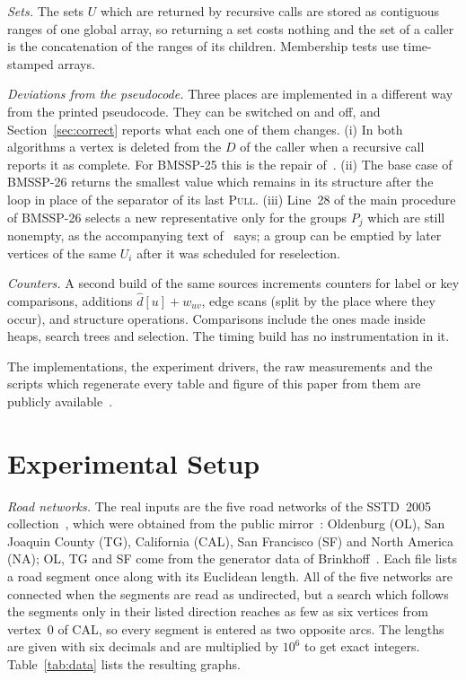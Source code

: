 \documentclass[conference,a4paper]{IEEEtran}
\newcommand{\dhat}{\widehat{d}}
\newcommand{\bmA}{BMSSP-25}
\newcommand{\bmB}{BMSSP-26}
\begin{document}
\emph{Sets.} The sets $U$ which are returned by recursive calls are stored as contiguous ranges
of one global array, so returning a set costs nothing and the set of a caller is the
concatenation of the ranges of its children. Membership tests use time-stamped arrays.

\emph{Deviations from the pseudocode.} Three places are implemented in a different way from the
printed pseudocode. They can be switched on and off, and Section~\ref{sec:correct} reports what
each one of them changes. (i) In both algorithms a vertex is deleted from the $D$ of the caller
when a recursive call reports it as complete. For \bmA{} this is the repair of~\cite{castro2025}.
(ii) The base case of \bmB{} returns the smallest value which remains in its structure after the
loop in place of the separator of its last \textsc{Pull}. (iii) Line~28 of the main procedure of
\bmB{} selects a new representative only for the groups $P_j$ which are still nonempty, as the
accompanying text of~\cite{duan2026} says; a group can be emptied by later vertices of the same
$U_i$ after it was scheduled for reselection.

\emph{Counters.} A second build of the same sources increments counters for label or key
comparisons, additions $\dhat[u]+w_{uv}$, edge scans (split by the place where they occur), and
structure operations. Comparisons include the ones made inside heaps, search trees and
selection. The timing build has no instrumentation in it.

The implementations, the experiment drivers, the raw measurements and the scripts which
regenerate every table and figure of this paper from them are publicly
available~\cite{thiscode}.

\section{Experimental Setup}\label{sec:setup}
\emph{Road networks.} The real inputs are the five road networks of the SSTD~2005
collection~\cite{li2005}, which were obtained from the public mirror~\cite{ansari2020}:
Oldenburg (OL), San Joaquin County (TG), California (CAL), San Francisco (SF) and North America
(NA); OL, TG and SF come from the generator data of Brinkhoff~\cite{brinkhoff2002}. Each file
lists a road segment once along with its Euclidean length. All of the five networks are
connected when the segments are read as undirected, but a search which follows the segments only
in their listed direction reaches as few as six vertices from vertex~0 of CAL, so every segment
is entered as two opposite arcs. The lengths are given with six decimals and are multiplied by
$10^6$ to get exact integers. Table~\ref{tab:data} lists the resulting graphs.
\end{document}
